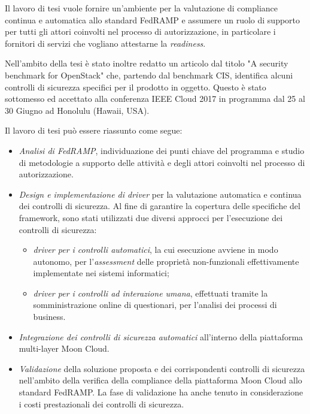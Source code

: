 \documentclass[../main.tex]{subfiles}
\begin{document}
Il lavoro di tesi vuole fornire un'ambiente per la valutazione di compliance continua e automatica allo standard FedRAMP e assumere un ruolo di supporto per tutti gli attori coinvolti nel processo di autorizzazione, in particolare i fornitori di servizi che vogliano attestarne la \textit{readiness}.


Nell'ambito della tesi è stato inoltre redatto un articolo dal titolo "A security benchmark for OpenStack" che, partendo dal benchmark CIS, identifica alcuni controlli di sicurezza specifici per il prodotto in oggetto.
Questo è stato sottomesso ed accettato alla conferenza IEEE Cloud 2017 in programma dal 25 al 30 Giugno  ad Honolulu (Hawaii, USA).


Il lavoro di tesi può essere riassunto come segue:
\begin{itemize}
\item \textit{Analisi di FedRAMP}, individuazione dei punti chiave del programma e studio di metodologie a supporto delle attività e degli attori coinvolti nel processo di autorizzazione.
\item \textit{Design e implementazione di driver} per la valutazione automatica e continua dei controlli di sicurezza.
Al fine di garantire la copertura delle specifiche del framework, sono stati utilizzati due diversi approcci per l'esecuzione dei controlli di sicurezza:
\begin{itemize}
\item \textit{driver per i controlli automatici}, la cui esecuzione avviene in modo autonomo, per l'\textit{assessment} delle proprietà non-funzionali effettivamente implementate nei sistemi informatici;
\item \textit{driver per i controlli ad interazione umana}, effettuati tramite la somministrazione online di questionari, per l'analisi dei processi di business.
\end{itemize}
\item \textit{Integrazione dei controlli di sicurezza automatici} all'interno della piattaforma multi-layer Moon Cloud.
\item \textit{Validazione} della soluzione proposta e dei corrispondenti controlli di sicurezza nell'ambito della verifica della compliance della piattaforma Moon Cloud allo standard FedRAMP. La fase di validazione ha anche tenuto in considerazione i costi prestazionali dei controlli di sicurezza.
\end{itemize}
\end{document}
